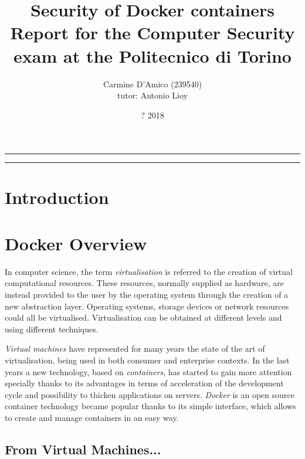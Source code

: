 \documentclass[a4paper,12pt]{article}
\begin{document}
\title{Security of Docker containers \\
{\normalsize Report for the Computer Security exam at the Politecnico di Torino}
} \author{Carmine D'Amico (239540) \\
{\normalsize tutor: Antonio Lioy} }
\date{? 2018}
\maketitle

\vfill

\rule{\textwidth}{1pt}

\tableofcontents

\rule{\textwidth}{1pt}

\vfill

\newpage

\section{Introduction}

\newpage

\section{Docker Overview}

In computer science, the term \textit{virtualisation} is referred to the
creation of virtual computational resources\cite{wikipedia_virtualization}.
These resources, normally supplied as hardware, are instead provided to the user
by the operating system through the creation of a new abstraction layer.
Operating systems, storage devices or network resources could all be
virtualised. Virtualisation can be obtained at different levels and using
different techniques. \par\textit{Virtual machines} have represented for many
years the state of the art of virtualisation, being used in both consumer and
enterprise contexts. In the last years a new technology, based on
\textit{containers}, has started to gain more attention specially thanks to its
advantages in terms of acceleration of the development cycle and possibility to
thicken applications on servers. \textit{Docker} is an open source container
technology became popular thanks to its simple interface, which allows to create
and manage containers in an easy way. 

\subsection{From Virtual Machines...}
\end{document}

